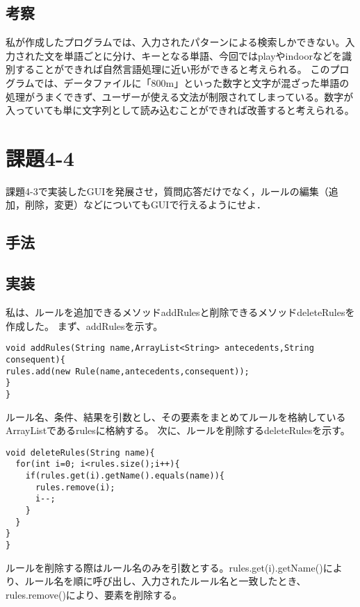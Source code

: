 \documentclass[a4j]{jarticle}
\begin{document}
\subsection{考察}
私が作成したプログラムでは、入力されたパターンによる検索しかできない。入力された文を単語ごとに分け、キーとなる単語、今回ではplayやindoorなどを識別することができれば自然言語処理に近い形ができると考えられる。
このプログラムでは、データファイルに「800m」といった数字と文字が混ざった単語の処理がうまくできず、ユーザーが使える文法が制限されてしまっている。数字が入っていても単に文字列として読み込むことができれば改善すると考えられる。

\section{課題4-4}
\begin{screen}
課題4-3で実装したGUIを発展させ，質問応答だけでなく，ルールの編集（追加，削除，変更）などについてもGUIで行えるようにせよ．
\end{screen}

\subsection{手法}

\subsection{実装}
私は、ルールを追加できるメソッドaddRulesと削除できるメソッドdeleteRulesを作成した。
まず、addRulesを示す。
\begin{lstlisting}[caption=addRulesメソッド]
void addRules(String name,ArrayList<String> antecedents,String consequent){
rules.add(new Rule(name,antecedents,consequent));
}
}
\end{lstlisting}
ルール名、条件、結果を引数とし、その要素をまとめてルールを格納しているArrayListであるrulesに格納する。
次に、ルールを削除するdeleteRulesを示す。
\begin{lstlisting}[caption=deleteRulesメソッド]
void deleteRules(String name){
  for(int i=0; i<rules.size();i++){
    if(rules.get(i).getName().equals(name)){
      rules.remove(i);
      i--;
    }
  }
}
}
\end{lstlisting}
ルールを削除する際はルール名のみを引数とする。rules.get(i).getName()により、ルール名を順に呼び出し、入力されたルール名と一致したとき、rules.remove()により、要素を削除する。
\end{document}
